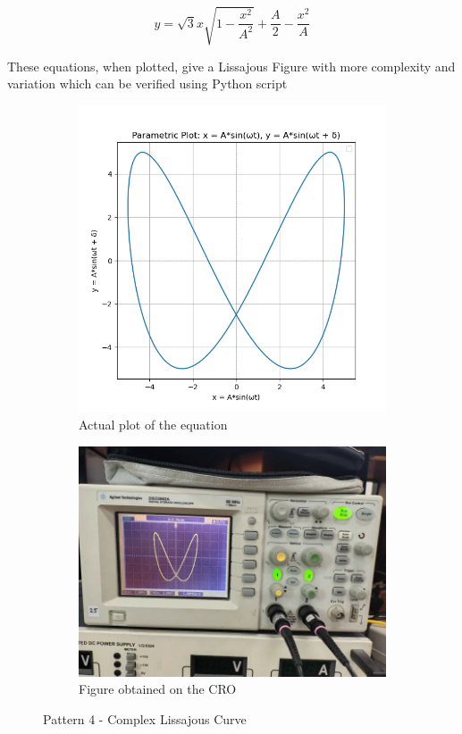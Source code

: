 \documentclass[12pt]{article}
\begin{document}
\[
y = \sqrt{3} x \sqrt{1 - \frac{x^2}{A^2}} + \frac{A}{2} - \frac{x^2}{A}
\]

These equations, when plotted, give a Lissajous Figure with more complexity and variation which can be verified using Python script

\begin{figure}[htbp]
    \centering
    \begin{subfigure}[b]{0.45\textwidth}
        \centering
        \includegraphics[width=\textwidth]{figs/Experiment-1/Observation-4/Figure_1.jpg}
        \caption{Actual plot of the equation}
    \end{subfigure}
    \hfill
    \begin{subfigure}[b]{0.45\textwidth}
        \centering
        \includegraphics[width=\textwidth]{figs/Experiment-1/Observation-4/Figure_2.png}
        \caption{Figure obtained on the CRO}
    \end{subfigure}
    \caption{Pattern 4 - Complex Lissajous Curve}
\end{figure}
\end{document}
